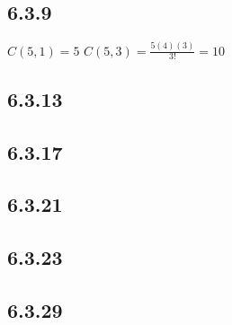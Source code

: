 \documentclass[12pt,titlepage]{extarticle}
\begin{document}
\subsection*{6.3.9}
\begin{tasks}
    \task $C(5,1) = 5$
    \task $C(5,3) = \frac{5(4)(3)}{3!} = 10$
\end{tasks}

\subsection*{6.3.13}
\subsection*{6.3.17}
\subsection*{6.3.21}
\subsection*{6.3.23}
\subsection*{6.3.29}
\end{document}
